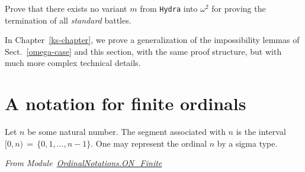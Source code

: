   


\begin{exercise}
Prove that there exists no variant $m$ from \texttt{Hydra} into $\omega^2$ for proving
    the  termination of all \emph{standard} battles.
\end{exercise}



\begin{remark}
In Chapter~\ref{ks-chapter}, we  prove a generalization of the impossibility lemmas of
Sect.~\ref{omega-case} and this section, with the same proof structure, but with much more 
complex technical details.
 \end{remark}





  


\section{A notation for finite ordinals}


Let $n$ be some natural number. The segment associated with $n$ is the interval 
$[0,n)\,=\,\{0,1,\dots,n-1\}$. 
One may represent the ordinal $n$ by a sigma type.


\vspace{4pt}
\noindent\emph{From Module~\href{../theories/html/hydras.OrdinalNotations.ON_Finite.html}{OrdinalNotations.ON\_Finite}}

